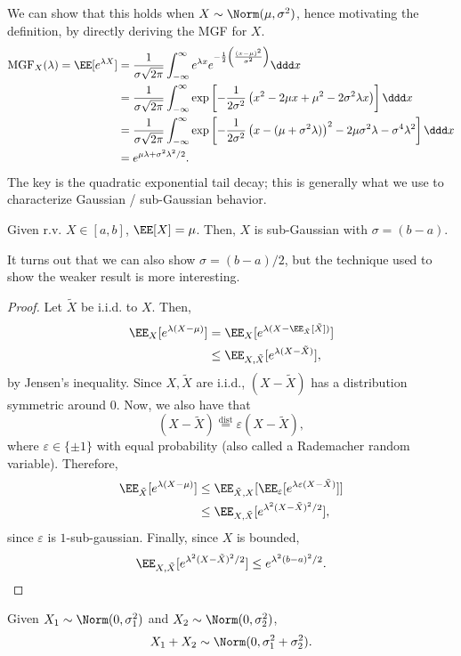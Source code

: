 We can show that this holds when $X\sim \Norm(\mu, \sigma^2)$, hence motivating the definition, by directly deriving the MGF for $X$.
\begin{align*}
	\text{MGF}_X(\lambda) = \EE[e^{\lambda X}] &= \frac{1}{\sigma \sqrt{2\pi}}\int_{-\infty}^{\infty}e^{\lambda x}e^{-\frac{1}{2}\left(\frac{(x-\mu)^2}{\sigma^2}\right)}\ddd x \\
																						 &= \frac{1}{\sigma\sqrt{2\pi}}\int_{-\infty}^{\infty}\exp\left[-\frac{1}{2\sigma^2}\left(x^2-2\mu x+\mu^2 - 2\sigma^2\lambda x\right)\right] \ddd x\\
																						 &= \frac{1}{\sigma\sqrt{2\pi}}\int_{-\infty}^{\infty}\exp\left[-\frac{1}{2\sigma^2}\left(x - (\mu + \sigma^2\lambda)\right)^2 - 2\mu\sigma^2\lambda - \sigma^4\lambda^2\right]\ddd x \\
																						 &= e^{\mu\lambda + \sigma^2\lambda^2/2}.
\end{align*}
The key is the quadratic exponential tail decay; this is generally what we use to characterize Gaussian / sub-Gaussian behavior. 

\begin{theorem}

Given r.v. $X\in [a,b]$, $\EE[X] = \mu$. Then, $X$ is sub-Gaussian with $\sigma=(b-a)$.
\end{theorem}

It turns out that we can also show $\sigma = (b-a)/2$, but the technique used to show the weaker result is more interesting.

\begin{proof}
Let $\tilde{X}$ be i.i.d. to $X$. Then,
\begin{align*}
	\EE_X[e^{\lambda(X-\mu)}] &= \EE_X[e^{\lambda(X - \EE_{\tilde{X}}[\tilde{X}])}] \\
														&\leq \EE_{X, \tilde{X}}[e^{\lambda(X-\tilde{X})}],
\end{align*}
by Jensen's inequality. Since $X,\tilde{X}$ are i.i.d., $(X-\tilde{X})$ has a distribution symmetric around $0$. Now, we also have that
\[(X-\tilde{X}) \overset{\text{dist}}{=} \varepsilon(X-\tilde{X}),\] 
where $\varepsilon \in \{\pm 1\}$ with equal probability (also called a \ac{Rademacher} random variable). Therefore, 
\begin{align*}
	\EE_{\tilde{X}}[e^{\lambda(X-\mu)}]&\leq \EE_{\tilde{X},X}[\EE_{\varepsilon}[e^{\lambda\varepsilon(X-\tilde{X})}]] \\
																		 &\leq \EE_{X, \tilde{X}}[e^{\lambda^2(X-\tilde{X})^2/2}],
\end{align*}
since $\varepsilon$ is $1$-sub-gaussian. Finally, since $X$ is bounded, 
\begin{align*}
	\EE_{X, \tilde{X}}[e^{\lambda^2(X-\tilde{X})^2/2}] \leq e^{\lambda^2(b-a)^2/2}.
\end{align*}
\end{proof}
\begin{definition}

Given $X_1\sim \Norm(0,\sigma_1^2)$ and $X_2\sim \Norm(0,\sigma_2^2)$, 
\[X_1+X_2\sim \Norm(0, \sigma_1^2+\sigma_2^2).\] 
\end{definition}


